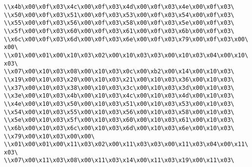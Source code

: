 \verb|\\x4b\x00\x0f\x03\x4c\x00\x0f\x03\x4d\x00\x0f\x03\x4e\x00\x0f\x03\|\newline
\verb|\\x50\x00\x0f\x03\x51\x00\x0f\x03\x53\x00\x0f\x03\x54\x00\x0f\x03\|\newline
\verb|\\x55\x00\x0f\x03\x56\x00\x0f\x03\x58\x00\x0f\x03\x5e\x00\x0f\x03\|\newline
\verb|\\x5f\x00\x0f\x03\x60\x00\x0f\x03\x61\x00\x0f\x03\x6b\x00\x0f\x03\|\newline
\verb|\\x6c\x00\x0f\x03\x6d\x00\x0f\x03\x6e\x00\x0f\x03\x79\x00\x0f\x03\x00\x00\|\newline
\verb|\\x01\x00\x01\x00\x10\x03\x02\x00\x10\x03\x03\x00\x10\x03\x04\x00\x10\x03\|\newline
\verb|\\x07\x00\x10\x03\x08\x00\x10\x03\x0c\x00\xb2\x00\x14\x00\x10\x03\|\newline
\verb|\\x19\x00\x10\x03\x20\x00\x10\x03\x21\x00\x10\x03\x36\x00\x10\x03\|\newline
\verb|\\x37\x00\x10\x03\x38\x00\x10\x03\x3c\x00\x10\x03\x3d\x00\x10\x03\|\newline
\verb|\\x3e\x00\x10\x03\x4b\x00\x10\x03\x4c\x00\x10\x03\x4d\x00\x10\x03\|\newline
\verb|\\x4e\x00\x10\x03\x50\x00\x10\x03\x51\x00\x10\x03\x53\x00\x10\x03\|\newline
\verb|\\x54\x00\x10\x03\x55\x00\x10\x03\x56\x00\x10\x03\x58\x00\x10\x03\|\newline
\verb|\\x5e\x00\x10\x03\x5f\x00\x10\x03\x60\x00\x10\x03\x61\x00\x10\x03\|\newline
\verb|\\x6b\x00\x10\x03\x6c\x00\x10\x03\x6d\x00\x10\x03\x6e\x00\x10\x03\|\newline
\verb|\\x79\x00\x10\x03\x00\x00\|\newline
\verb|\\x01\x00\x01\x00\x11\x03\x02\x00\x11\x03\x03\x00\x11\x03\x04\x00\x11\x03\|\newline
\verb|\\x07\x00\x11\x03\x08\x00\x11\x03\x14\x00\x11\x03\x19\x00\x11\x03\|\newline
